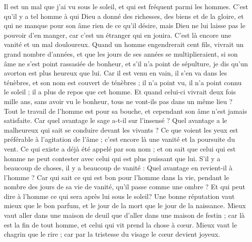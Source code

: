 \begin{multicols}{2}
\VerseOne{}Il est un mal que j'ai vu sous le soleil, et qui est fréquent parmi les hommes.
C'est qu'il y a tel homme à qui Dieu a donné des richesses, des biens et de la gloire, et qui ne manque pour son âme rien de ce qu'il désire, mais Dieu ne lui laisse pas le pouvoir d’en manger, car c’est un étranger qui en jouira. C’est là encore une vanité et un mal douloureux.
Quand un homme engendrerait cent fils, vivrait un grand nombre d’années, et que les jours de ses années se multiplieraient, si son âme ne s'est point rassasiée de bonheur, et s'il n'a point de sépulture, je dis qu'un avorton est plus heureux que lui.
Car il est venu en vain, il s'en va dans les ténèbres, et son nom est couvert de ténèbres ;
il n’a point vu, il n’a point connu le soleil ; il a plus de repos que cet homme.
Et quand celui-ci vivrait deux fois mille ans, sans avoir vu le bonheur, tous ne vont-ils pas dans un même lieu ?
Tout le travail de l'homme est pour sa bouche, et cependant son âme n’est jamais satisfaite.
Car quel avantage le sage a-t-il sur l’insensé ? Quel avantage a le malheureux qui sait se conduire devant les vivants ?
Ce que voient les yeux est préférable à l’agitation de l’âme ; c’est encore là une vanité et la poursuite du vent.
Ce qui existe a déjà été appelé par son nom ; et on sait que celui qui est homme ne peut contester avec celui qui est plus puissant que lui.
S’il y a beaucoup de choses, il y a beaucoup de vanité : Quel avantage en revient-il à l'homme ?
Car qui sait ce qui est bon pour l'homme dans la vie, pendant le nombre des jours de sa vie de vanité, qu’il passe comme une ombre ? Et qui peut dire à l'homme ce qui sera après lui sous le soleil?
\VerseOne{}Une bonne réputation vaut mieux que le bon parfum, et le jour de la mort que le jour de la naissance.
Mieux vaut aller dans une maison de deuil que d'aller dans une maison de festin ; car là est la fin de tout homme, et celui qui vit prend la chose à cœur.
Mieux vaut le chagrin que le rire ; car par la tristesse du visage le cœur devient joyeux.

\end{multicols}

